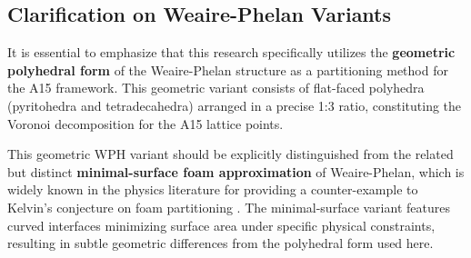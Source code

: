 \documentclass[10pt]{article}
\begin{document}
\subsection{Clarification on Weaire-Phelan Variants}
\label{subsec-wp-variants}

It is essential to emphasize that this research specifically utilizes the \textbf{geometric polyhedral form} of the Weaire-Phelan structure as a partitioning method for the A15 framework. This geometric variant consists of flat-faced polyhedra (pyritohedra and tetradecahedra) arranged in a precise 1:3 ratio, constituting the Voronoi decomposition for the A15 lattice points.

This geometric WPH variant should be explicitly distinguished from the related but distinct \textbf{minimal-surface foam approximation} of Weaire-Phelan, which is widely known in the physics literature for providing a counter-example to Kelvin's conjecture on foam partitioning \cite{Kelvin1887, Kusner1996, WeaireHutzler2001}. The minimal-surface variant features curved interfaces minimizing surface area under specific physical constraints, resulting in subtle geometric differences from the polyhedral form used here.
\end{document}
